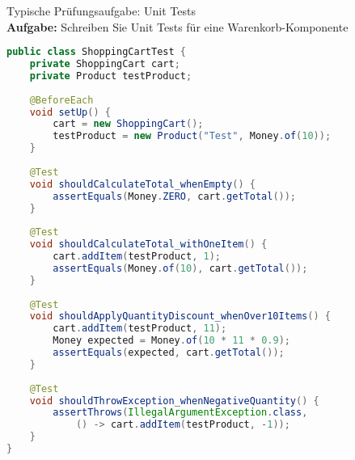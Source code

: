 \begin{example2}[breakable]{Typische Prüfungsaufgabe: Unit Tests}\\
\textbf{Aufgabe:} Schreiben Sie Unit Tests für eine Warenkorb-Komponente

\begin{lstlisting}[language=Java, style=base]
public class ShoppingCartTest {
    private ShoppingCart cart;
    private Product testProduct;
    
    @BeforeEach
    void setUp() {
        cart = new ShoppingCart();
        testProduct = new Product("Test", Money.of(10));
    }
    
    @Test
    void shouldCalculateTotal_whenEmpty() {
        assertEquals(Money.ZERO, cart.getTotal());
    }
    
    @Test
    void shouldCalculateTotal_withOneItem() {
        cart.addItem(testProduct, 1);
        assertEquals(Money.of(10), cart.getTotal());
    }
    
    @Test 
    void shouldApplyQuantityDiscount_whenOver10Items() {
        cart.addItem(testProduct, 11);
        Money expected = Money.of(10 * 11 * 0.9);
        assertEquals(expected, cart.getTotal());
    }
    
    @Test
    void shouldThrowException_whenNegativeQuantity() {
        assertThrows(IllegalArgumentException.class, 
            () -> cart.addItem(testProduct, -1));
    }
}
\end{lstlisting}
\end{example2}

